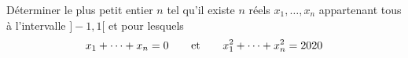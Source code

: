 Déterminer le plus petit entier $n$ tel qu'il existe $n$ réels $x_1, \dots, x_n$ appartenant tous à l'intervalle $]-1, 1[$ et pour lesquels 
$$x_1 + \dots + x_n = 0 \hspace{6mm} \text{ et } \hspace{6mm}
x_1^2 + \dots + x_n^2 = 2020$$